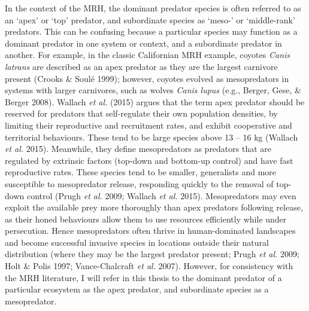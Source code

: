 \documentclass[11pt,a4paper,titlepage,twoside,openright]{style/unimelbthesis}
\begin{document}
\begin{mainmatter}
In the context of the MRH, the dominant predator species is often referred to as an `apex' or `top' predator, and subordinate species as `meso-' or `middle-rank' predators. This can be confusing because a particular species may function as a dominant predator in one system or context, and a subordinate predator in another. For example, in the classic Californian MRH example, coyotes \emph{Canis latrans} are described as an apex predator as they are the largest carnivore present (Crooks \& Soulé 1999); however, coyotes evolved as mesopredators in systems with larger carnivores, such as wolves \emph{Canis lupus} (e.g., Berger, Gese, \& Berger 2008). Wallach \emph{et al.} (2015) argues that the term apex predator should be reserved for predators that self-regulate their own population densities, by limiting their reproductive and recruitment rates, and exhibit cooperative and territorial behaviours. These tend to be large species above 13 -- 16 kg (Wallach \emph{et al.} 2015). Meanwhile, they define mesopredators as predators that are regulated by extrinsic factors (top-down and bottom-up control) and have fast reproductive rates. These species tend to be smaller, generalists and more susceptible to mesopredator release, responding quickly to the removal of top-down control (Prugh \emph{et al.} 2009; Wallach \emph{et al.} 2015). Mesopredators may even exploit the available prey more thoroughly than apex predators following release, as their honed behaviours allow them to use resources efficiently while under persecution. Hence mesopredators often thrive in human-dominated landscapes and become successful invasive species in locations outside their natural distribution (where they may be the largest predator present; Prugh \emph{et al.} 2009; Holt \& Polis 1997; Vance-Chalcraft \emph{et al.} 2007). However, for consistency with the MRH literature, I will refer in this thesis to the dominant predator of a particular ecosystem as the apex predator, and subordinate species as a mesopredator.


\end{mainmatter}
\end{document}
